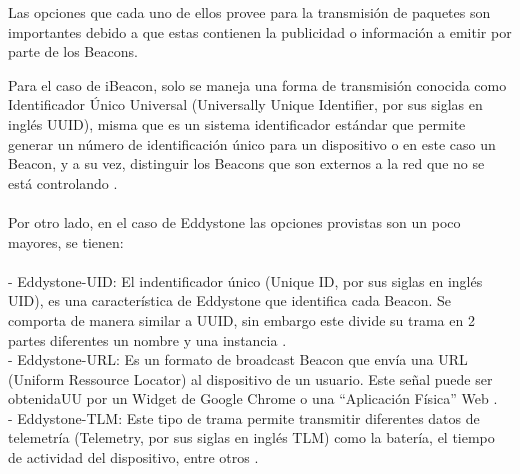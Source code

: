 Las opciones que cada uno de ellos provee para la transmisión de paquetes son importantes debido a que estas contienen la publicidad o información a emitir por parte de los Beacons.
\\ \par
Para el caso de iBeacon, solo se maneja una forma de transmisión conocida como Identificador Único Universal (Universally Unique Identifier, por sus siglas en inglés UUID), misma que es un sistema identificador estándar que permite generar un número de identificación único para un dispositivo o en este caso un Beacon, y a su vez, distinguir los Beacons que son externos a la red que no se está controlando \cite{UUID}.
\\\\ Por otro lado, en el caso de Eddystone las opciones provistas son un poco mayores, se tienen:\\
\\
- Eddystone-UID: El indentificador único (Unique ID, por sus siglas en inglés UID), es una característica de Eddystone que identifica cada Beacon. Se comporta de manera similar a UUID, sin embargo este divide su trama en 2 partes diferentes un nombre y una instancia \cite{UID}.
\\
- Eddystone-URL: Es un formato de broadcast Beacon que envía una URL (Uniform Ressource Locator) al dispositivo de un usuario. Este señal puede ser obtenidaUU por un Widget de Google Chrome o una ``Aplicación Física'' Web \cite{URL}.
\\
- Eddystone-TLM: Este tipo de trama permite transmitir diferentes datos de telemetría (Telemetry, por sus siglas en inglés TLM) como la batería, el tiempo de actividad del dispositivo, entre otros \cite{TLM}.

